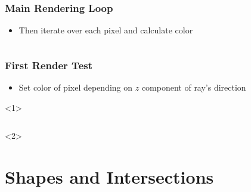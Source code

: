 \documentclass{beamer}
\begin{document}
\begin{frame}[fragile]
	\frametitle{Main Rendering Loop}
	\begin{itemize}
		\item Then iterate over each pixel and calculate color
	\end{itemize}
	\inputminted[fontsize=\footnotesize]{python}{scripts/mainLoop2.py}
\end{frame}

\begin{frame}[fragile]
	\frametitle{First Render Test}
	\begin{itemize}
		\item Set color of pixel depending on $z$ component of ray's direction
	\end{itemize}
	\begin{onlyenv}
		\inputminted{python}{scripts/firstRender.py}
	\end{onlyenv}
\end{frame}

\section{Shapes and Intersections}
\end{document}
